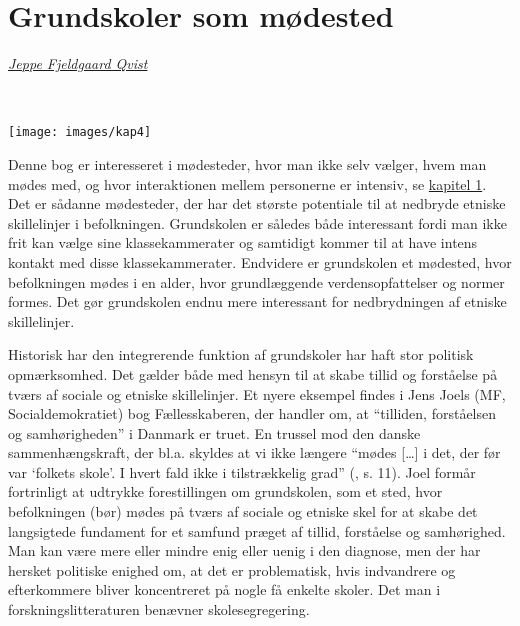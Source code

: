 \documentclass[
]{book}
\begin{document}
\newpage
\thispagestyle{empty}

\chapter{Grundskoler som mødested}\label{kap4}

\thispagestyle{empty}

\emph{\href{https://vbn.aau.dk/da/persons/jeppefl}{Jeppe Fjeldgaard Qvist}}

~~~~

\texttt{[image: images/kap4]}

\newpage

Denne bog er interesseret i mødesteder, hvor man ikke selv vælger, hvem man mødes med, og hvor interaktionen mellem personerne er intensiv, se \hyperref[kap1]{kapitel 1}. Det er sådanne mødesteder, der har det største potentiale til at nedbryde etniske skillelinjer i befolkningen. Grundskolen er således både interessant fordi man ikke frit kan vælge sine klassekammerater og samtidigt kommer til at have intens kontakt med disse klassekammerater. Endvidere er grundskolen et mødested, hvor befolkningen mødes i en alder, hvor grundlæggende verdensopfattelser og normer formes. Det gør grundskolen endnu mere interessant for nedbrydningen af etniske skillelinjer.

Historisk har den integrerende funktion af grundskoler har haft stor politisk opmærksomhed. Det gælder både med hensyn til at skabe tillid og forståelse på tværs af sociale og etniske skillelinjer. Et nyere eksempel findes i Jens Joels (MF, Socialdemokratiet) bog Fællesskaberen, der handler om, at ``tilliden, forståelsen og samhørigheden'' i Danmark er truet. En trussel mod den danske sammenhængskraft, der bl.a. skyldes at vi ikke længere ``mødes {[}\ldots{]} i det, der før var `folkets skole'. I hvert fald ikke i tilstrækkelig grad'' (, s. 11). Joel formår fortrinligt at udtrykke forestillingen om grundskolen, som et sted, hvor befolkningen (bør) mødes på tværs af sociale og etniske skel for at skabe det langsigtede fundament for et samfund præget af tillid, forståelse og samhørighed. Man kan være mere eller mindre enig eller uenig i den diagnose, men der har hersket politiske enighed om, at det er problematisk, hvis indvandrere og efterkommere bliver koncentreret på nogle få enkelte skoler. Det man i forskningslitteraturen benævner skolesegregering.
\end{document}
